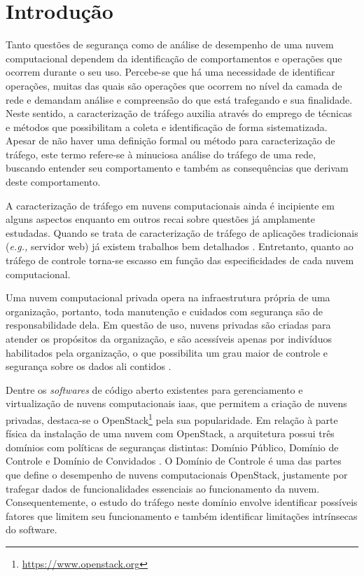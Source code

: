 \chapter{Introdução}
\label{cap1}

Tanto questões de segurança como de análise de desempenho de uma nuvem computacional dependem da identificação de comportamentos e operações que ocorrem durante o seu uso.
%
Percebe-se que há uma necessidade de identificar operações, muitas das quais são operações  que ocorrem no nível da camada de rede e demandam análise e compreensão do que está trafegando e sua finalidade.
%
Neste sentido, a caracterização de tráfego auxilia através do emprego de técnicas e métodos que possibilitam a coleta e identificação de forma sistematizada.
%
Apesar de não haver uma definição formal ou método para caracterização de tráfego, este termo refere-se à minuciosa análise do tráfego de uma rede, buscando entender seu comportamento e também as consequências que derivam deste comportamento.

A caracterização de tráfego em nuvens computacionais ainda é incipiente em alguns aspectos enquanto em outros recai sobre questões já amplamente estudadas.
%
Quando se trata de caracterização de tráfego de aplicações tradicionais (\textit{e.g.,} servidor web) já existem trabalhos bem detalhados \cite{arlitt:1996:web,braun:1995:web,gill:2007:youtube}.
%
Entretanto, quanto ao tráfego de controle torna-se escasso em função das especificidades de cada nuvem computacional.

Uma nuvem computacional privada opera na infraestrutura própria de uma organização, portanto, toda manutenção e cuidados com segurança são de responsabilidade dela. 
%
Em questão de uso, nuvens privadas são criadas para atender os propósitos da organização, e são acessíveis apenas por indivíduos habilitados pela organização, o que possibilita um grau maior de controle e segurança sobre os dados ali contidos \cite{Jadeja:2012:clouddeliverymodels}.

Dentre os \textit{softwares} de código aberto existentes para gerenciamento e virtualização de nuvens computacionais \ac{iaas}, que permitem a criação de nuvens privadas, destaca-se o OpenStack\footnote{\url{https://www.openstack.org}} pela sua popularidade.
%
Em relação à parte física da instalação de uma nuvem com OpenStack, a arquitetura possui três domínios com políticas de seguranças distintas: Domínio Público, Domínio de Controle e Domínio de Convidados \cite{openstack:newton}. 
%
O Domínio de Controle é uma das partes que define o desempenho de nuvens computacionais OpenStack, justamente por trafegar dados de funcionalidades essenciais ao funcionamento da nuvem.
%
Consequentemente, o estudo do tráfego neste domínio envolve identificar possíveis fatores que limitem seu funcionamento e também identificar limitações intrínsecas do software. 

